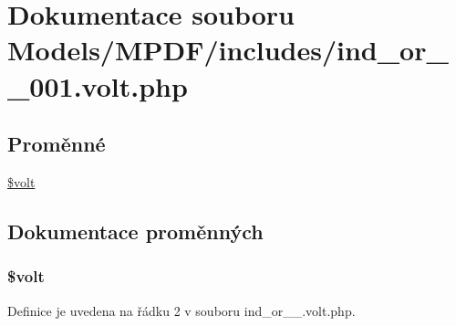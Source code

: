 \hypertarget{ind__or__1__001_8volt_8php}{\section{Dokumentace souboru Models/\-M\-P\-D\-F/includes/ind\-\_\-or\-\_\-\_\-001.volt.\-php}
\label{ind__or__1__001_8volt_8php}
}
\subsection*{Proměnné}
\begin{DoxyCompactItemize}
\item 
\hyperlink{ind__or__1__001_8volt_8php_a013d9bcd621d002433e25a82dd593989}{\$volt}
\end{DoxyCompactItemize}


\subsection{Dokumentace proměnných}
\hypertarget{ind__or__1__001_8volt_8php_a013d9bcd621d002433e25a82dd593989}{
\subsubsection[{\$volt}]{\setlength{\rightskip}{0pt plus 5cm}\$volt}}\label{ind__or__1__001_8volt_8php_a013d9bcd621d002433e25a82dd593989}


Definice je uvedena na řádku 2 v souboru ind\-\_\-or\-\_\-\_.\-volt.\-php.

